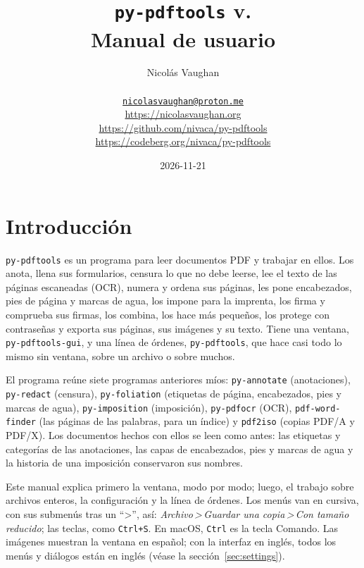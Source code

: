 \documentclass[12pt,
              article,
              oneside
              ]{memoir}
\title{\bfseries%
  \texttt{py-pdftools} v.\version{} \\
  Manual de usuario}
\author{%
  Nicolás Vaughan\\
  \begin{minipage}[t]{0.8\linewidth}
    \centering\small%
    \href{mailto:nicolasvaughan@proton.me}{\texttt{nicolasvaughan@proton.me}}\\
    \url{https://nicolasvaughan.org}\\
    \url{https://github.com/nivaca/py-pdftools}\\
    \url{https://codeberg.org/nivaca/py-pdftools}\\
  \end{minipage}}
\date{2026-11-21}
\newcommand*{\menu}[1]{\textit{#1}}
\newcommand*{\then}{\,>\,}
\newcommand*{\key}[1]{\texttt{#1}}
\begin{document}
\maketitle

\tableofcontents*

\section{Introducción}
\noindent
\texttt{py-pdftools} es un programa para leer documentos PDF y trabajar en
ellos. Los anota, llena sus formularios, censura lo que no debe leerse, lee
el texto de las páginas escaneadas (OCR), numera y ordena sus páginas, les
pone encabezados, pies de página y marcas de agua, los impone para la
imprenta, los firma y comprueba sus firmas, los combina, los hace más
pequeños, los protege con contraseñas y exporta sus páginas, sus imágenes y
su texto. Tiene una ventana, \texttt{py-pdftools-gui}, y una línea de
órdenes, \texttt{py-pdftools}, que hace casi todo lo mismo sin ventana,
sobre un archivo o sobre muchos.

%
El programa reúne siete programas anteriores míos: \texttt{py-annotate}
(anotaciones), \texttt{py-redact} (censura), \texttt{py-foliation}
(etiquetas de página, encabezados, pies y marcas de agua),
\texttt{py-imposition} (imposición), \texttt{py-pdfocr} (OCR),
\texttt{pdf-word-finder} (las páginas de las palabras, para un índice) y
\texttt{pdf2iso} (copias PDF/A y PDF/X). Los documentos hechos con ellos se
leen como antes: las etiquetas y categorías de las anotaciones, las capas
de encabezados, pies y marcas de agua y la historia de una imposición
conservaron sus nombres.

%
Este manual explica primero la ventana, modo por modo; luego, el trabajo
sobre archivos enteros, la configuración y la línea de órdenes. Los menús
van en cursiva, con sus submenús tras un \enquote{>}, así:
\menu{Archivo\then Guardar una copia\then Con tamaño reducido}; las teclas, como
\key{Ctrl+S}. En macOS, \key{Ctrl} es la tecla Comando. Las imágenes
muestran la ventana en español; con la interfaz en inglés, todos los menús
y diálogos están en inglés (véase la sección~\ref{sec:settings}).
\end{document}
